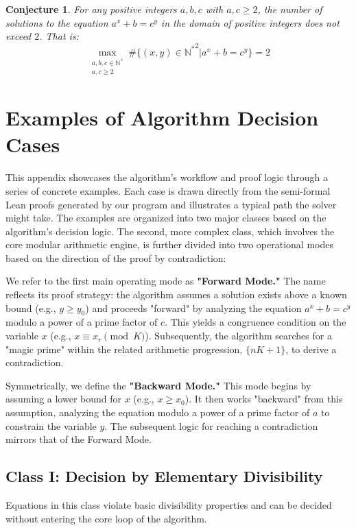 \documentclass{article}
\newtheorem{conjecture}[theorem]{Conjecture}
\begin{document}
\begin{conjecture}
For any positive integers $a, b, c$ with $a,c \ge 2$, the number of solutions to the equation $a^x+b=c^y$ in the domain of positive integers does not exceed $2$. That is:
$$ \max_{\substack{a, b, c\in \mathbb{N}^*\\a, c\ge 2}}\#\{(x, y)\in\mathbb{N^*}^2|a^x+b=c^y\}=2 $$
\end{conjecture}




\appendix
\section{Examples of Algorithm Decision Cases}
\label{sec:appendix}

This appendix showcases the algorithm's workflow and proof logic through a series of concrete examples. Each case is drawn directly from the semi-formal Lean proofs generated by our program and illustrates a typical path the solver might take. The examples are organized into two major classes based on the algorithm's decision logic. The second, more complex class, which involves the core modular arithmetic engine, is further divided into two operational modes based on the direction of the proof by contradiction:

We refer to the first main operating mode as \textbf{"Forward Mode."} The name reflects its proof strategy: the algorithm assumes a solution exists above a known bound (e.g., $y \ge y_0$) and proceeds "forward" by analyzing the equation $a^x+b=c^y$ modulo a power of a prime factor of $c$. This yields a congruence condition on the variable $x$ (e.g., $x \equiv x_r \pmod K$). Subsequently, the algorithm searches for a "magic prime" within the related arithmetic progression, $\{nK+1\}$, to derive a contradiction.

Symmetrically, we define the \textbf{"Backward Mode."} This mode begins by assuming a lower bound for $x$ (e.g., $x \ge x_0$). It then works "backward" from this assumption, analyzing the equation modulo a power of a prime factor of $a$ to constrain the variable $y$. The subsequent logic for reaching a contradiction mirrors that of the Forward Mode.

\subsection{Class I: Decision by Elementary Divisibility}
\label{app:class1}
Equations in this class violate basic divisibility properties and can be decided without entering the core loop of the algorithm.
\end{document}
